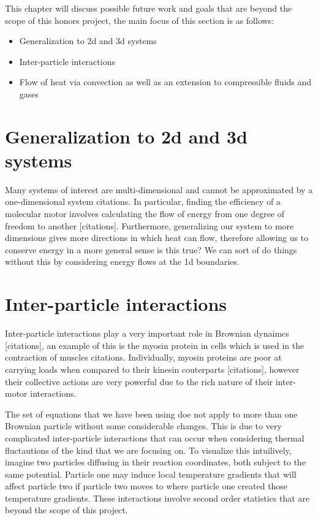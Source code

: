 This chapter will discuss possible future work and goals that are beyond the scope of this honors project, the main focus of this section is as follows:

\begin{itemize}
    \item{Generalization to 2d and 3d systems}
    \item{Inter-particle interactions}
    \item{Flow of heat via convection as well as an extension to compressible fluids and gases}
\end{itemize}

\section{Generalization to 2d and 3d systems}
Many systems of interest are multi-dimensional and cannot be approximated by a one-dimensional system {\color{red} citations}. In particular, finding the efficiency of a molecular motor involves calculating the flow of energy from one degree of freedom to another {\color{red} [citations]}. Furthermore, generalizing our system to more dimensions gives more directions in which heat can flow, therefore allowing us to conserve energy in a more general sense {\color{red} is this true? We can sort of do things without this by considering energy flows at the 1d boundaries.}

\section{Inter-particle interactions}
Inter-particle interactions play a very important role in Brownian dynaimcs {\color{red} [citations]}, an example of this is the myosin protein in cells which is used in the contraction of muscles {\color{red} citations}. Individually, myosin proteins are poor at carrying loads when compared to their kinesin couterparts {\color{red} [citations]}, however their collective actions are very powerful due to the rich nature of their inter-motor interactions.

The set of equations that we have been using doe not apply to more than one Brownian particle without some considerable changes. This is due to very complicated inter-particle interactions that can occur when considering thermal fluctautions of the kind that we are focusing on. To visualize this intuilively, imagine two particles diffusing in their reaction coordinates, both subject to the same potential. Particle one may induce local temperature gradients that will affect particle two if particle two moves to where particle one created those temperature gradients. These interactions involve second order statistics that are beyond the scope of this project.

